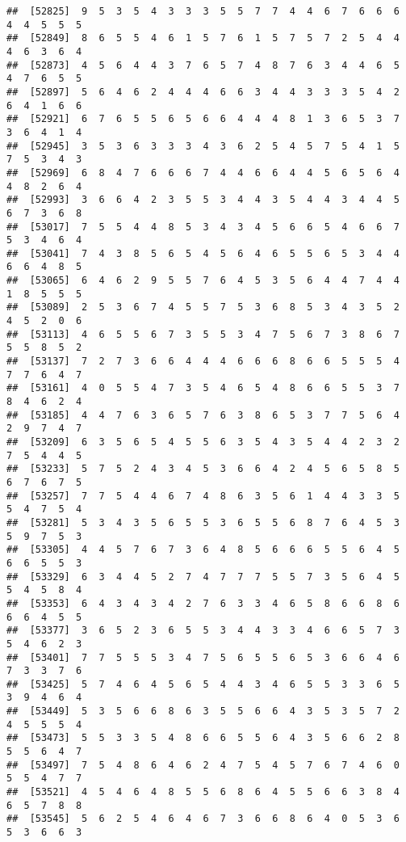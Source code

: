 \documentclass[
]{book}
\begin{document}
\begin{verbatim}
##  [52825]  9  5  3  5  4  3  3  3  5  5  7  7  4  4  6  7  6  6  6  4  4  5  5  5
##  [52849]  8  6  5  5  4  6  1  5  7  6  1  5  7  5  7  2  5  4  4  4  6  3  6  4
##  [52873]  4  5  6  4  4  3  7  6  5  7  4  8  7  6  3  4  4  6  5  4  7  6  5  5
##  [52897]  5  6  4  6  2  4  4  4  6  6  3  4  4  3  3  3  5  4  2  6  4  1  6  6
##  [52921]  6  7  6  5  5  6  5  6  6  4  4  4  8  1  3  6  5  3  7  3  6  4  1  4
##  [52945]  3  5  3  6  3  3  3  4  3  6  2  5  4  5  7  5  4  1  5  7  5  3  4  3
##  [52969]  6  8  4  7  6  6  6  7  4  4  6  6  4  4  5  6  5  6  4  4  8  2  6  4
##  [52993]  3  6  6  4  2  3  5  5  3  4  4  3  5  4  4  3  4  4  5  6  7  3  6  8
##  [53017]  7  5  5  4  4  8  5  3  4  3  4  5  6  6  5  4  6  6  7  5  3  4  6  4
##  [53041]  7  4  3  8  5  6  5  4  5  6  4  6  5  5  6  5  3  4  4  6  6  4  8  5
##  [53065]  6  4  6  2  9  5  5  7  6  4  5  3  5  6  4  4  7  4  4  1  8  5  5  5
##  [53089]  2  5  3  6  7  4  5  5  7  5  3  6  8  5  3  4  3  5  2  4  5  2  0  6
##  [53113]  4  6  5  5  6  7  3  5  5  3  4  7  5  6  7  3  8  6  7  5  5  8  5  2
##  [53137]  7  2  7  3  6  6  4  4  4  6  6  6  8  6  6  5  5  5  4  7  7  6  4  7
##  [53161]  4  0  5  5  4  7  3  5  4  6  5  4  8  6  6  5  5  3  7  8  4  6  2  4
##  [53185]  4  4  7  6  3  6  5  7  6  3  8  6  5  3  7  7  5  6  4  2  9  7  4  7
##  [53209]  6  3  5  6  5  4  5  5  6  3  5  4  3  5  4  4  2  3  2  7  5  4  4  5
##  [53233]  5  7  5  2  4  3  4  5  3  6  6  4  2  4  5  6  5  8  5  6  7  6  7  5
##  [53257]  7  7  5  4  4  6  7  4  8  6  3  5  6  1  4  4  3  3  5  5  4  7  5  4
##  [53281]  5  3  4  3  5  6  5  5  3  6  5  5  6  8  7  6  4  5  3  5  9  7  5  3
##  [53305]  4  4  5  7  6  7  3  6  4  8  5  6  6  6  5  5  6  4  5  6  6  5  5  3
##  [53329]  6  3  4  4  5  2  7  4  7  7  7  5  5  7  3  5  6  4  5  5  4  5  8  4
##  [53353]  6  4  3  4  3  4  2  7  6  3  3  4  6  5  8  6  6  8  6  6  6  4  5  5
##  [53377]  3  6  5  2  3  6  5  5  3  4  4  3  3  4  6  6  5  7  3  5  4  6  2  3
##  [53401]  7  7  5  5  5  3  4  7  5  6  5  5  6  5  3  6  6  4  6  7  3  3  7  6
##  [53425]  5  7  4  6  4  5  6  5  4  4  3  4  6  5  5  3  3  6  5  3  9  4  6  4
##  [53449]  5  3  5  6  6  8  6  3  5  5  6  6  4  3  5  3  5  7  2  4  5  5  5  4
##  [53473]  5  5  3  3  5  4  8  6  6  5  5  6  4  3  5  6  6  2  8  5  5  6  4  7
##  [53497]  7  5  4  8  6  4  6  2  4  7  5  4  5  7  6  7  4  6  0  5  5  4  7  7
##  [53521]  4  5  4  6  4  8  5  5  6  8  6  4  5  5  6  6  3  8  4  6  5  7  8  8
##  [53545]  5  6  2  5  4  6  4  6  7  3  6  6  8  6  4  0  5  3  6  5  3  6  6  3

\end{verbatim}
\end{document}

